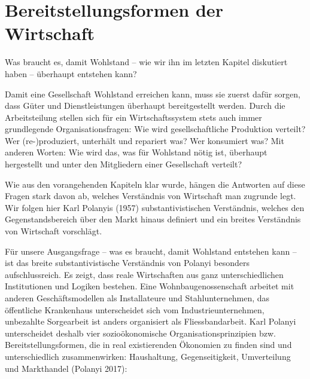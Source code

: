 \documentclass[
  nswissgerman,
  a4paper,
  DIV=11,
  numbers=noendperiod,
  oneside,
  openany]{scrreprt}
\begin{document}
\section{Bereitstellungsformen der
Wirtschaft}\label{bereitstellungsformen-der-wirtschaft}

\begin{tcolorbox}[enhanced jigsaw, arc=.35mm, bottomrule=.15mm, bottomtitle=1mm, breakable, colback=white, colbacktitle=quarto-callout-note-color!10!white, colframe=quarto-callout-note-color-frame, coltitle=black, left=2mm, leftrule=.75mm, opacityback=0, opacitybacktitle=0.6, rightrule=.15mm, title={Leitfrage}, titlerule=0mm, toprule=.15mm, toptitle=1mm]

Was braucht es, damit Wohlstand -- wie wir ihn im letzten Kapitel
diskutiert haben -- überhaupt entstehen kann?

\end{tcolorbox}

Damit eine Gesellschaft Wohlstand erreichen kann, muss sie zuerst dafür
sorgen, dass Güter und Dienstleistungen überhaupt bereitgestellt werden.
Durch die Arbeitsteilung stellen sich für ein Wirtschaftssystem stets
auch immer grundlegende Organisationsfragen: Wie wird gesellschaftliche
Produktion verteilt? Wer (re-)produziert, unterhält und repariert was?
Wer konsumiert was? Mit anderen Worten: Wie wird das, was für Wohlstand
nötig ist, überhaupt hergestellt und unter den Mitgliedern einer
Gesellschaft verteilt?

Wie aus den vorangehenden Kapiteln klar wurde, hängen die Antworten auf
diese Fragen stark davon ab, welches Verständnis von Wirtschaft man
zugrunde legt. Wir folgen hier Karl Polanyis (1957) substantivistischen
Verständnis, welches den Gegenstandsbereich über den Markt hinaus
definiert und ein breites Verständnis von Wirtschaft vorschlägt.

Für unsere Ausgangsfrage -- was es braucht, damit Wohlstand entstehen
kann -- ist das breite substantivistische Verständnis von Polanyi
besonders aufschlussreich. Es zeigt, dass reale Wirtschaften aus ganz
unterschiedlichen Institutionen und Logiken bestehen. Eine
Wohnbaugenossenschaft arbeitet mit anderen Geschäftsmodellen als
Installateure und Stahlunternehmen, das öffentliche Krankenhaus
unterscheidet sich vom Industrieunternehmen, unbezahlte Sorgearbeit ist
anders organisiert als Fliessbandarbeit. Karl Polanyi unterscheidet
deshalb vier sozioökonomische Organisationsprinzipien bzw.
Bereitstellungsformen, die in real existierenden Ökonomien zu finden
sind und unterschiedlich zusammenwirken: Haushaltung, Gegenseitigkeit,
Umverteilung und Markthandel (Polanyi 2017):
\end{document}
